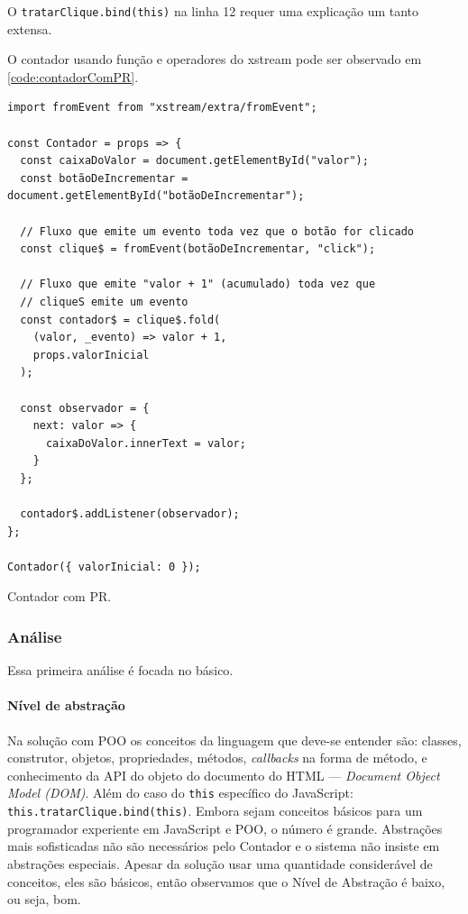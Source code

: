O \texttt{tratarClique.bind(this)} na linha 12 requer uma explicação um tanto
extensa.

O contador usando função e operadores do xstream pode ser observado em
\ref{code:contadorComPR}.

\begin{listing}[htbp]
\begin{verbatim}
import fromEvent from "xstream/extra/fromEvent";

const Contador = props => {
  const caixaDoValor = document.getElementById("valor");
  const botãoDeIncrementar = document.getElementById("botãoDeIncrementar");

  // Fluxo que emite um evento toda vez que o botão for clicado
  const clique$ = fromEvent(botãoDeIncrementar, "click");

  // Fluxo que emite "valor + 1" (acumulado) toda vez que
  // cliqueS emite um evento
  const contador$ = clique$.fold(
    (valor, _evento) => valor + 1,
    props.valorInicial
  );

  const observador = {
    next: valor => {
      caixaDoValor.innerText = valor;
    }
  };

  contador$.addListener(observador);
};

Contador({ valorInicial: 0 });
\end{verbatim}
\caption{\label{code:contadorComPR}Contador com PR.}
\end{listing}

\subsubsection{Análise}
\label{sec:orgc3642b8}

Essa primeira análise é focada no básico.

\paragraph{Nível de abstração}
\label{sec:org4136f4d}
Na solução com POO os conceitos da linguagem que deve-se entender são:
classes, construtor, objetos, propriedades, métodos, \emph{callbacks} na forma
de método, e conhecimento da API do objeto do documento do HTML ---
\emph{Document Object Model (DOM)}.
Além do caso do \texttt{this} específico do JavaScript:
\texttt{this.tratarClique.bind(this)}.
Embora sejam conceitos básicos para um programador experiente em JavaScript
e POO, o número é grande.
Abstrações mais sofisticadas não são necessários pelo Contador e o sistema
não insiste em abstrações especiais.
Apesar da solução usar uma quantidade considerável de conceitos, eles são
básicos, então observamos que o Nível de Abstração é baixo, ou seja, bom.

